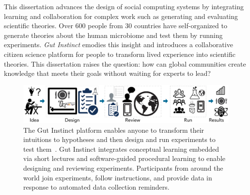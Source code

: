 



This dissertation advances the design of social computing systems by integrating learning and collaboration for complex work such as generating and evaluating scientific theories. Over 600 people from 30 countries have self-organized to generate theories about the human microbiome and test them by running experiments. \textit{Gut Instinct} emodies this insight and introduces a collaborative citizen science platform for people to transform lived experience into scientific theories. This dissertation raises the question: how can global communities create knowledge that meets their goals without waiting for experts to lead?

\begin{figure}[b] 
  \centering
  \includegraphics[width=1.0\textwidth]{figures/intro/intro-1}
  \caption[The Gut Instinct platform enables anyone to transform their intuitions to hypotheses 
and then design and run experiments to test them]
{The Gut Instinct platform enables anyone to transform their intuitions to hypotheses 
and then design and run experiments to test them~\cite{Pandey2017,Pandey2018,Pandey}. Gut Instinct integrates 
conceptual learning embedded via short lectures and software-guided procedural 
learning to enable designing and reviewing experiments. Participants from around
 the world join experiments, follow instructions, and provide data in response to 
automated data collection reminders. }
  \label{fig:intro-1}
\end{figure}

